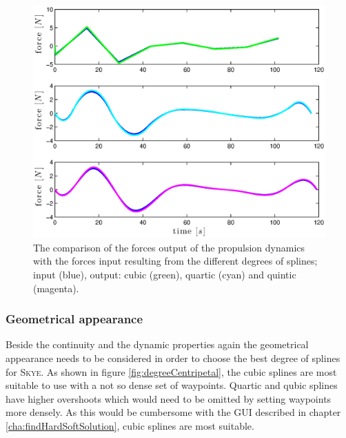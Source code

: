 \begin{figure}[H]
	\centering
    \includegraphics[width = \textwidth]{graphics/forces.eps}
  \caption{The comparison of the forces output of the propulsion dynamics with the forces input resulting from the different degrees of splines; input (blue), output: cubic (green), quartic (cyan) and quintic (magenta).}
\label{fig:forces}
\end{figure} 


\subsubsection{Geometrical appearance}
Beside the continuity and the dynamic properties again the geometrical appearance needs to be considered in order to choose the best degree of splines for \textsc{Skye}. As shown in figure \ref{fig:degreeCentripetal}, the cubic splines are most suitable to use with a not so dense set of waypoints. Quartic and qubic splines have higher overshoots which would need to be omitted by setting waypoints more densely. As this would be cumbersome with the GUI described in chapter \ref{cha:findHardSoftSolution}, cubic splines are most suitable. 

